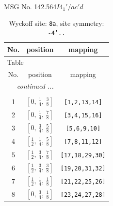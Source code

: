\documentclass[fleqn,8pt]{jsarticle}
\begin{document}
\setcounter{MaxMatrixCols}{32}

\renewcommand{\tablename}{Table~}
\renewcommand{\figurename}{Figure~}
\begin{center}
\LARGE
MSG No. 142.564\quad$I4_{1}'/ac'd$
\end{center}
\renewcommand{\arraystretch}{1.2}
\begin{longtable}{ccc}
\caption{Wyckoff site: {\tt 8a}, site symmetry: {\tt -4'..}}
 \\
 \hline \hline
No. & position & mapping \\ \hline \endfirsthead

\multicolumn{2}{l}{\tablename\ \thetable{}} \\
 \hline \hline
No. & position & mapping \\ \hline \endhead

 \hline \hline
\multicolumn{2}{r}{\footnotesize\it continued ...} \\ \endfoot

 \hline \hline
\multicolumn{2}{r}{} \\ \endlastfoot

1 & $\left[ 0,\, \frac{1}{4},\, \frac{3}{8} \right]$ & {\tt [1,2,13,14]} \\ \hline
2 & $\left[ 0,\, \frac{1}{4},\, \frac{7}{8} \right]$ & {\tt [3,4,15,16]} \\ \hline
3 & $\left[ 0,\, \frac{3}{4},\, \frac{5}{8} \right]$ & {\tt [5,6,9,10]} \\ \hline
4 & $\left[ \frac{1}{2},\, \frac{1}{4},\, \frac{5}{8} \right]$ & {\tt [7,8,11,12]} \\ \hline
5 & $\left[ \frac{1}{2},\, \frac{3}{4},\, \frac{7}{8} \right]$ & {\tt [17,18,29,30]} \\ \hline
6 & $\left[ \frac{1}{2},\, \frac{3}{4},\, \frac{3}{8} \right]$ & {\tt [19,20,31,32]} \\ \hline
7 & $\left[ \frac{1}{2},\, \frac{1}{4},\, \frac{1}{8} \right]$ & {\tt [21,22,25,26]} \\ \hline
8 & $\left[ 0,\, \frac{3}{4},\, \frac{1}{8} \right]$ & {\tt [23,24,27,28]} \\
\end{longtable}
\renewcommand{\arraystretch}{1.2}
\end{document}
